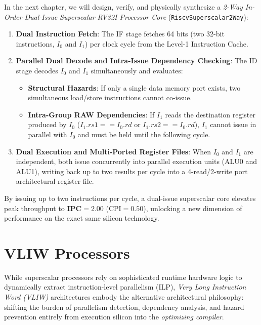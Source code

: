 In the next chapter, we will design, verify, and physically synthesize a \textit{2-Way In-Order Dual-Issue Superscalar RV32I Processor Core} (\texttt{RiscvSuperscalar2Way}):
\begin{enumerate}
    \item \textbf{Dual Instruction Fetch}: The IF stage fetches 64 bits (two 32-bit instructions, $I_0$ and $I_1$) per clock cycle from the Level-1 Instruction Cache.
    \item \textbf{Parallel Dual Decode and Intra-Issue Dependency Checking}: The ID stage decodes $I_0$ and $I_1$ simultaneously and evaluates:
    \begin{itemize}
        \item \textbf{Structural Hazards}: If only a single data memory port exists, two simultaneous load/store instructions cannot co-issue.
        \item \textbf{Intra-Group RAW Dependencies}: If $I_1$ reads the destination register produced by $I_0$ ($I_1.rs1 == I_0.rd$ or $I_1.rs2 == I_0.rd$), $I_1$ cannot issue in parallel with $I_0$ and must be held until the following cycle.
    \end{itemize}
    \item \textbf{Dual Execution and Multi-Ported Register Files}: When $I_0$ and $I_1$ are independent, both issue concurrently into parallel execution units (ALU0 and ALU1), writing back up to two results per cycle into a 4-read/2-write port architectural register file.
\end{enumerate}
By issuing up to two instructions per cycle, a dual-issue superscalar core elevates peak throughput to $\mathbf{\text{IPC} = 2.00}$ ($\text{CPI} = 0.50$), unlocking a new dimension of performance on the exact same silicon technology.


\section{VLIW Processors}\label{riscvVLIW}

While superscalar processors rely on sophisticated runtime hardware logic to dynamically extract instruction-level parallelism (ILP), \textit{Very Long Instruction Word (VLIW)} architectures embody the alternative architectural philosophy: shifting the burden of parallelism detection, dependency analysis, and hazard prevention entirely from execution silicon into the \textit{optimizing compiler}.

